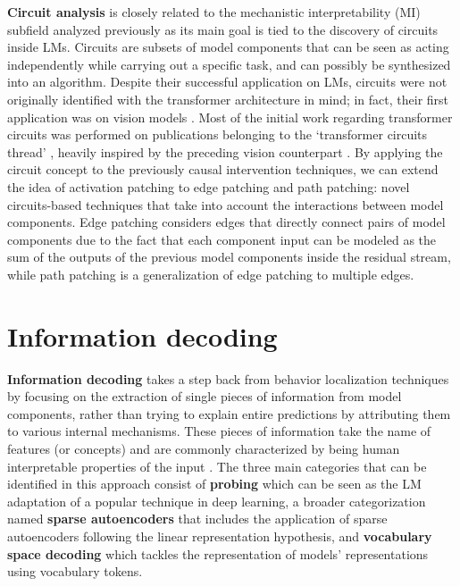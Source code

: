 \textbf{Circuit analysis} is closely related to the mechanistic interpretability (MI) subfield analyzed previously as its main goal is tied to the discovery of circuits inside LMs.
Circuits are subsets of model components that can be seen as acting independently while carrying out a specific task, and can possibly be synthesized into an algorithm.
Despite their successful application on LMs, circuits were not originally identified with the transformer architecture in mind; in fact, their first application was on vision models \cite{cammarata2020}.
Most of the initial work regarding transformer circuits was performed on publications belonging to the `transformer circuits thread' , heavily inspired by the preceding vision counterpart \cite{cammarata2020}.
By applying the circuit concept to the previously causal intervention techniques, we can extend the idea of activation patching to edge patching and path patching: novel circuits-based techniques that take into account the interactions between model components.
Edge patching  considers edges that directly connect pairs of model components due to the fact that each component input can be modeled as the sum of the outputs of the previous model components inside the residual stream, while path patching  is a generalization of edge patching to multiple edges.


\section{Information decoding}

\textbf{Information decoding} takes a step back from behavior localization techniques by focusing on the extraction of single pieces of information from model components, rather than trying to explain entire predictions by attributing them to various internal mechanisms.
These pieces of information take the name of features (or concepts) and are commonly characterized by being human interpretable properties of the input \cite{kim2018}.
The three main categories that can be identified in this approach consist of \textbf{probing} which can be seen as the LM adaptation of a popular technique in deep learning, a broader categorization named \textbf{sparse autoencoders} that includes the application of sparse autoencoders following the linear representation hypothesis, and \textbf{vocabulary space decoding} which tackles the representation of models' representations using vocabulary tokens.

